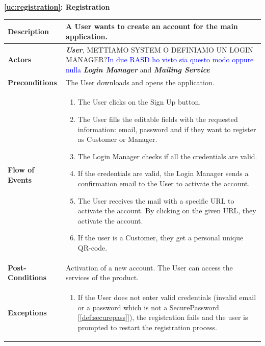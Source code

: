 \documentclass[a4paper, 10pt, oneside]{article}
\newcommand*{\lorenzo}[1]{\textcolor{BurntOrange}{#1}}
\newcommand{\giovanni}[1]{\textcolor{Blue}{#1}}
\begin{document}
\begin{center}
{\textbf{\ref{uc:registration}: Registration}}
\end{center}
\begin{tabularx}{\linewidth}{| l | X |}
	
	\hline
	\textbf{Description} & A User wants to create an account for the main application.\\
	

	\hline
	\textbf{Actors} & \textbf{\textit{User}}, \lorenzo{METTIAMO SYSTEM O DEFINIAMO UN LOGIN MANAGER?}\giovanni{In due RASD ho visto sia questo modo oppure nulla} \textbf{\textit{Login Manager}} and \textbf{\textit{Mailing Service}}\\
	
	\hline
	\textbf{Preconditions} & The User downloads and opens the application.\\
	
	\hline
	\textbf{Flow of Events} & \parbox{0.7\textwidth}{	
		\begin{enumerate}
			\item The User clicks on the Sign Up button.
			\item The User fills the editable fields with the requested information: email, password and if they want to register as Customer or Manager.
			\item The \lorenzo{Login Manager} checks if all the credentials are valid.
			\item If the credentials are valid, the \lorenzo{Login Manager} sends a confirmation email to the User to activate the account.
			\item The User receives the mail with a specific URL to activate the account. By clicking on the given URL, they activate the account.
			\item If the user is a Customer, they get a personal unique QR-code.
	\end{enumerate}}\\
	
	\hline
	\textbf{Post-Conditions} & Activation of a new account. The User can access the services of the product.\\
	
	\hline
	\textbf{Exceptions} & \parbox{0.7\textwidth}{ \begin{enumerate}
			\item If the User does not enter valid credentials (invalid email or a password which is not a SecurePassword [\ref{def:securepass}]), the registration fails and the user is prompted to restart the registration process.
		\end{enumerate}}\\

	\hline
	
\end{tabularx}
\end{document}

